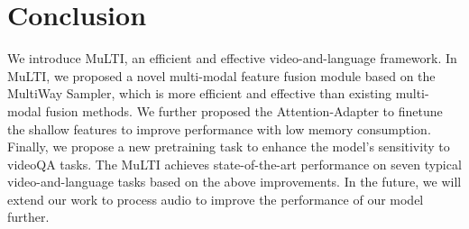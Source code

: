 \documentclass[10pt,twocolumn,letterpaper]{article}
\begin{document}
\section{Conclusion}
\vspace{-1ex}
\label{sec:conclusion}
We introduce MuLTI, an efficient and effective video-and-language framework. In MuLTI, we proposed a novel multi-modal feature fusion module based on the MultiWay Sampler, which is more efficient and effective than existing multi-modal fusion methods. We further proposed the Attention-Adapter to finetune the shallow features to improve performance with low memory consumption. Finally, we propose a new pretraining task to enhance the model's sensitivity to videoQA tasks. The MuLTI achieves state-of-the-art performance on seven typical video-and-language tasks based on the above improvements. In the future, we will extend our work to process audio to improve the performance of our model further. 
\end{document}
